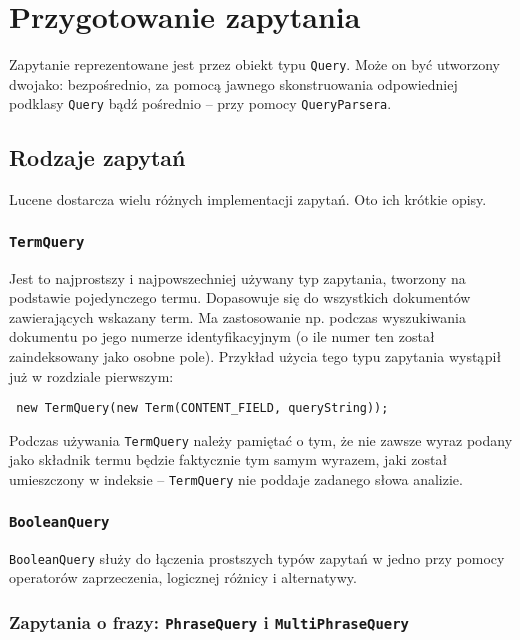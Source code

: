 \chapter{Przygotowanie zapytania}

Zapytanie reprezentowane jest przez obiekt typu \texttt{Query}. Może on być utworzony dwojako: bezpośrednio, za pomocą jawnego skonstruowania odpowiedniej podklasy \texttt{Query} bądź pośrednio -- przy pomocy \texttt{QueryParsera}.

\section{Rodzaje zapytań}

Lucene dostarcza wielu różnych implementacji zapytań. Oto ich krótkie opisy.

\subsection{\texttt{TermQuery}}

Jest to najprostszy i najpowszechniej używany typ zapytania, tworzony na podstawie pojedynczego termu. Dopasowuje się do wszystkich dokumentów zawierających wskazany term. Ma zastosowanie np. podczas wyszukiwania dokumentu po jego numerze identyfikacyjnym (o ile numer ten został zaindeksowany jako osobne pole). Przykład użycia tego typu zapytania wystąpił już w rozdziale pierwszym:

\begin{lstlisting}
 new TermQuery(new Term(CONTENT_FIELD, queryString));
\end{lstlisting}

Podczas używania \texttt{TermQuery} należy pamiętać o tym, że nie zawsze wyraz podany jako składnik termu będzie faktycznie tym samym wyrazem, jaki został umieszczony w indeksie -- \texttt{TermQuery} nie poddaje zadanego słowa analizie.

\subsection{\texttt{BooleanQuery}}

\texttt{BooleanQuery} służy do łączenia prostszych typów zapytań w jedno przy pomocy operatorów zaprzeczenia, logicznej różnicy i alternatywy. 

\subsection{Zapytania o frazy: \texttt{PhraseQuery} i \texttt{MultiPhraseQuery}}

